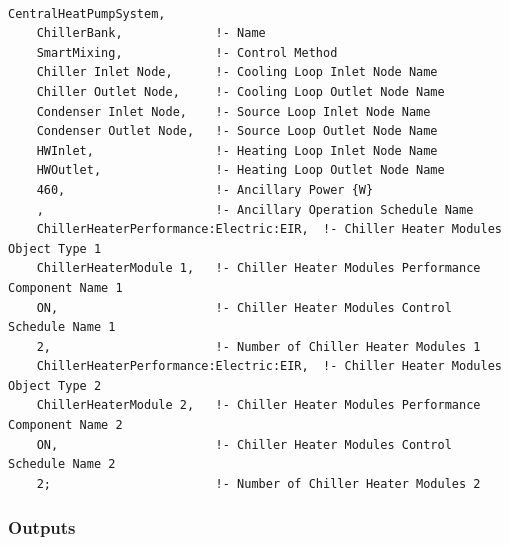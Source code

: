\begin{lstlisting}

CentralHeatPumpSystem,
    ChillerBank,             !- Name
    SmartMixing,             !- Control Method
    Chiller Inlet Node,      !- Cooling Loop Inlet Node Name
    Chiller Outlet Node,     !- Cooling Loop Outlet Node Name
    Condenser Inlet Node,    !- Source Loop Inlet Node Name
    Condenser Outlet Node,   !- Source Loop Outlet Node Name
    HWInlet,                 !- Heating Loop Inlet Node Name
    HWOutlet,                !- Heating Loop Outlet Node Name
    460,                     !- Ancillary Power {W}
    ,                        !- Ancillary Operation Schedule Name
    ChillerHeaterPerformance:Electric:EIR,  !- Chiller Heater Modules Object Type 1
    ChillerHeaterModule 1,   !- Chiller Heater Modules Performance Component Name 1
    ON,                      !- Chiller Heater Modules Control Schedule Name 1
    2,                       !- Number of Chiller Heater Modules 1
    ChillerHeaterPerformance:Electric:EIR,  !- Chiller Heater Modules Object Type 2
    ChillerHeaterModule 2,   !- Chiller Heater Modules Performance Component Name 2
    ON,                      !- Chiller Heater Modules Control Schedule Name 2
    2;                       !- Number of Chiller Heater Modules 2
\end{lstlisting}

\subsubsection{Outputs}\label{outputs-17-000}

